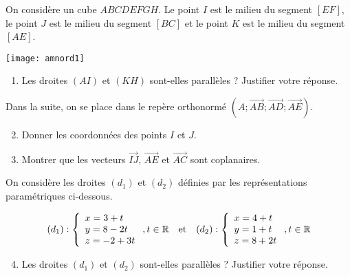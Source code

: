 \documentclass[11pt,fleqn, openany]{book} %
\begin{document}
\begin{exercise}[subtitle={(Amérique du Nord 2021)}]

On considère un cube $ABCDEFGH$. Le point $I$ est le milieu du segment $[EF]$, le point $J$ est le milieu du segment $[BC]$ et le point $K$ est le milieu du segment $[AE]$.

\begin{center}
\texttt{[image: amnord1]}
\end{center}

\begin{enumerate}
\item Les droites $(AI)$ et $(KH)$ sont-elles parallèles ? Justifier votre réponse.
\end{enumerate}
Dans la suite, on se place dans le repère orthonormé $(A ; \overrightarrow{AB} ; \overrightarrow{AD}; \overrightarrow{AE})$.
\begin{enumerate}
\setcounter{enumi}{1}
\item Donner les coordonnées des points $I$ et $J$.
\item Montrer que les vecteurs $\overrightarrow{IJ}$, $\overrightarrow{AE}$ et $\overrightarrow{AC}$ sont coplanaires.
\end{enumerate}
On considère les droites $(d_1)$ et $(d_2)$ définies par les représentations paramétriques ci-dessous.

\[ (d_1) : \left\{\renewcommand{\arraystretch}{1}\begin{array}{l} x = 3+t \\ y = 8-2t\\ z = -2+3t 
\end{array}\right. , t\in \mathbb{R} \quad \text{et} \quad (d_2) : \left\{\renewcommand{\arraystretch}{1}\begin{array}{l} x = 4+t \\ y = 1+t \\ z = 8+2t
\end{array}\right. , t\in \mathbb{R}\]

\begin{enumerate}
\setcounter{enumi}{3}
\item Les droites $(d_1)$ et $(d_2)$ sont-elles parallèles ? Justifier votre réponse.
\end{enumerate}
\newpage
\end{exercise}
\end{document}
